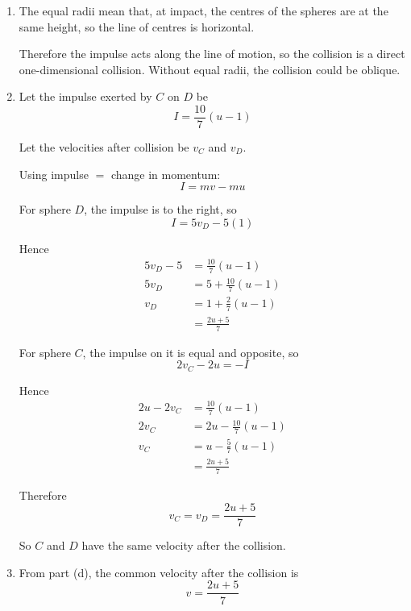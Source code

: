 \documentclass[leqno]{article}
\begin{document}
\begin{enumerate}[
  label=\textbf{\arabic*.},
  leftmargin=*,
  topsep=0pt,
  partopsep=0pt,
  parsep=0pt
]
\begin{djsSolution}
\begin{enumerate}[label=\textbf{(\alph*)}]
  Therefore
  \[
  \frac12+\frac32e^2=\frac{26}{25}
  \]

  Solving:
  \begin{align*}
  \frac32e^2&=\frac{26}{25}-\frac12=\frac{27}{50}\\
  e^2&=\frac{27}{50}\times \frac23=\frac{9}{25}
  \end{align*}

  Since $0\le e\le 1$:
  \[
  e=\frac35
  \]

  \item The equal radii mean that, at impact, the centres of the spheres are at the same height, so the line of centres is horizontal.

  Therefore the impulse acts along the line of motion, so the collision is a direct one-dimensional collision. Without equal radii, the collision could be oblique.

  \item Let the impulse exerted by $C$ on $D$ be
  \[
  I=\frac{10}{7}(u-1)
  \]

  Let the velocities after collision be $v_C$ and $v_D$.

  Using impulse \(=\) change in momentum:
  \[
  I=mv-mu
  \]

  For sphere $D$, the impulse is to the right, so
  \[
  I=5v_D-5(1)
  \]

  Hence
  \begin{align*}
  5v_D-5&=\frac{10}{7}(u-1)\\
  5v_D&=5+\frac{10}{7}(u-1)\\
  v_D&=1+\frac{2}{7}(u-1)\\
  &=\frac{2u+5}{7}
  \end{align*}

  For sphere $C$, the impulse on it is equal and opposite, so
  \[
  2v_C-2u=-I
  \]

  Hence
  \begin{align*}
  2u-2v_C&=\frac{10}{7}(u-1)\\
  2v_C&=2u-\frac{10}{7}(u-1)\\
  v_C&=u-\frac{5}{7}(u-1)\\
  &=\frac{2u+5}{7}
  \end{align*}

  Therefore
  \[
  v_C=v_D=\frac{2u+5}{7}
  \]

  So $C$ and $D$ have the same velocity after the collision.

  \item From part (d), the common velocity after the collision is
  \[
  v=\frac{2u+5}{7}
  \]


\end{enumerate}
\end{djsSolution}
\end{enumerate}
\end{document}
